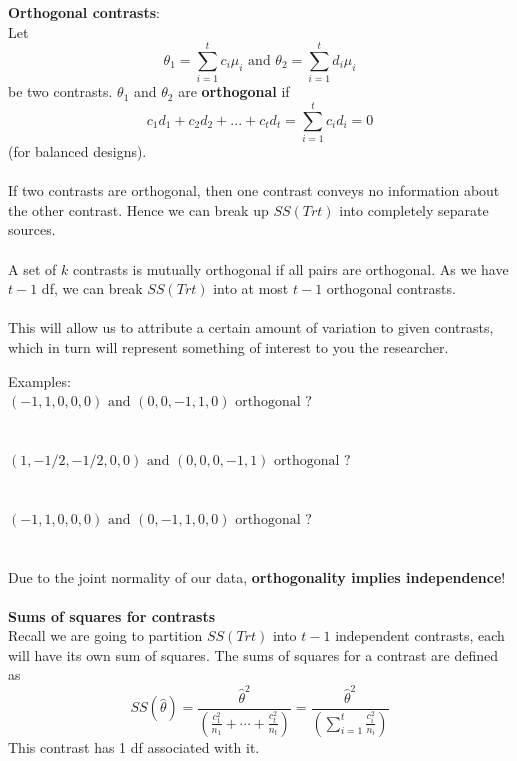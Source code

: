 \textbf{Orthogonal contrasts}:\\
Let 
$$\theta_1=\sum_{i=1}^{t}c_i\mu_i \mbox{    and    }\theta_2=\sum_{i=1}^{t}d_i\mu_i$$
be two contrasts.  $\theta_1$ and $\theta_2$ are \textbf{orthogonal} if 
$$c_1d_1+c_2d_2+...+c_td_t=\sum_{i=1}^{t}c_id_i=0$$
(for balanced designs).\\~\\
If two contrasts are orthogonal, then one contrast conveys no information about the other contrast.  Hence we can break up $SS(Trt)$ into completely separate sources.\\~\\
A set of $k$ contrasts is mutually orthogonal if all pairs are orthogonal. As we have $t-1$ df, we can break $SS(Trt)$ into at most $t-1$ orthogonal contrasts.\\~\\
This will allow us to attribute a certain amount of variation to given contrasts, which in turn will represent something of interest to you the researcher.

\newpage

Examples:\\
$ (-1,1,0,0,0) \mbox{ and } (0,0,-1,1,0) \mbox{ orthogonal ?}$\\~\\~\\
$ (1,-1/2,-1/2,0,0) \mbox{ and } (0,0,0,-1,1) \mbox{ orthogonal ?}$\\~\\~\\
$ (-1,1,0,0,0) \mbox{ and } (0,-1,1,0,0) \mbox{ orthogonal ?}$\\~\\~\\
Due to the joint normality of our data, \textbf{orthogonality implies independence}!  \\~\\

\textbf{Sums of squares for contrasts}\\
Recall we are going to partition $SS(Trt)$ into $t-1$ independent contrasts, each will have its own sum of squares.  The sums of squares for a contrast are defined as
$$ SS(\hat\theta)=\frac{\hat\theta^2}{\left(\frac{c_1^2}{n_1}+\cdots+\frac{c_t^2}{n_t}\right)}=\frac{\hat\theta^2}{\left(\sum_{i=1}^{t}\frac{c_i^2}{n_i}\right)}$$
This contrast has 1 df associated with it.\\~\\

